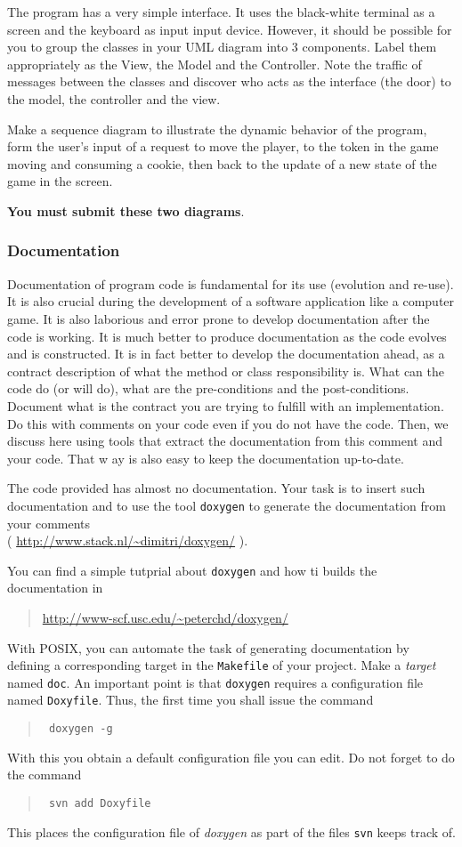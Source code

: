 \documentclass[article,12pt]{article}
\begin{document}
{The program has a very simple interface. It uses the black-white terminal as a screen and
the keyboard as input input device. However, it should be possible for you
to group the classes in your UML diagram into 3 components.
Label them appropriately as the View, the Model and the Controller.
Note the traffic of messages between the classes and discover
who acts as the interface (the door) to the model, the controller and the view.

Make a sequence diagram to illustrate the dynamic behavior of the program,
form the user's input of a request to move the player, to the token
in the game moving and consuming a cookie, then back to the update of a new
state of the game in the screen.

{\bf You must submit these two diagrams}.


\subsubsection*{Documentation}
Documentation of program code is fundamental for its use
(evolution and re-use).
It is also crucial during the development of a software application
like a computer game.
It is also laborious and error prone to develop documentation after
the code is working. It is much better to produce documentation
as the code evolves and is constructed.
It is in fact better to develop the documentation ahead, as a contract
description of what the method or class responsibility is.
What can the code do (or will do), what are the pre-conditions and the post-conditions.
Document what is the contract you are trying to fulfill with
an implementation.
Do this with comments on your code even if you do not have the code.
Then, we discuss here using tools that extract the documentation
from this comment and your code. That w ay is also easy to keep the
documentation up-to-date.

The code provided has almost no documentation. Your task is to insert such documentation
and to use the tool
{\tt doxygen}  to generate the documentation from your comments\\
({\small
\url{
http://www.stack.nl/~dimitri/doxygen/}
}
).

You can find a simple tutprial about
{\tt doxygen} and how ti builds the documentation in
\begin{quote}
{\footnotesize
\url{
http://www-scf.usc.edu/~peterchd/doxygen/
}}
\end{quote}

With POSIX, you can automate the task of generating documentation
by defining a corresponding target in the
 {\tt Makefile} of your project.
Make a  {\em target} named {\tt doc}.
An important point is that
{\tt doxygen} requires a configuration file named
 {\tt Doxyfile}.
Thus, the first time you shall issue the command
\begin{quote}
{\tt
doxygen -g
}
\end{quote}
With this you obtain a default configuration file you can edit.
Do not forget to do the command
\begin{quote}
{\tt
svn add Doxyfile
}
\end{quote}
This places the configuration file of {\em doxygen} as part of the
files {\tt svn} keeps track of.

}
\end{document}
